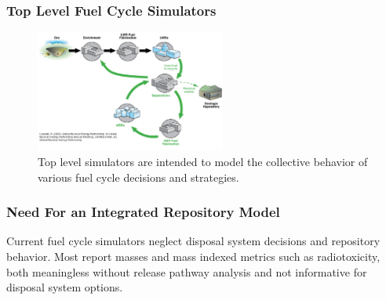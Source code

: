 

\begin{frame}[ctb!]
  \frametitle{Top Level Fuel Cycle Simulators}
  \begin{figure}[htbp!]
    \begin{center}
      \includegraphics[height=4cm]{simulations.eps}
    \end{center}
    \caption{Top level simulators are intended to model the collective 
    behavior of various fuel cycle decisions and 
    strategies.\cite{lisowski_global_2007}}
    \label{fig:simulation}
  \end{figure}
\end{frame}

\begin{frame}[ctb!]
  \frametitle{Need For an Integrated Repository Model}
  Current fuel cycle simulators neglect disposal system decisions and 
  repository behavior. Most report masses and mass indexed metrics such 
  as radiotoxicity, both meaningless without release pathway analysis
  and not informative for disposal system options.

\end{frame}

